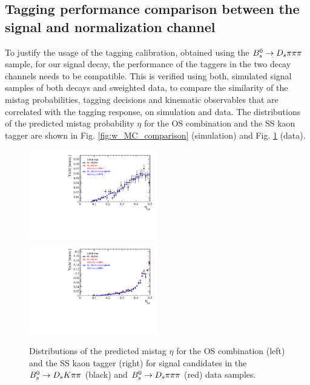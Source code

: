 \subsection{Tagging performance comparison between the signal and normalization channel}
\label{subsec: TaggingComparison}

To justify the usage of the tagging calibration, obtained using the ${{B}^0_{s}}\rightarrow{\ensuremath{{D}_{s}}}{\ensuremath{\pi}}{\ensuremath{\pi}}{\ensuremath{\pi}}$ sample, for our signal decay, the performance of the taggers in the two decay channels needs to be compatible. 
This is verified using both, simulated signal samples of both decays and sweighted data, 
to compare the similarity of the mistag probabilities, tagging decisions and kinematic observables that are correlated with the tagging response, on simulation and data.  \newline
The distributions of the predicted mistag probability $\eta$ for the OS combination and the SS kaon tagger are shown in Fig. \ref{fig:w_MC_comparison} (simulation) and Fig. \ref{fig:w_data_comparison} (data).
 


\begin{figure}[h]
\includegraphics[height=!,width=0.5\textwidth]{figs/dataVsMC/norm2signal/Ds2all_Bs_TAGOMEGA_OS.pdf}
\includegraphics[height=!,width=0.5\textwidth]{figs/dataVsMC/norm2signal/Ds2all_Bs_SS_nnetKaon_PROB.pdf}
\caption{Distributions of the predicted mistag $\eta$ for the OS combination (left) and the SS kaon tagger (right) 
for signal candidates in the ${{B}^0_{s}}\rightarrow{\ensuremath{{D}_{s}}}{\ensuremath{K}}{\ensuremath{\pi}}{\ensuremath{\pi}}$ (black) and ${{B}^0_{s}}\rightarrow{\ensuremath{{D}_{s}}}{\ensuremath{\pi}}{\ensuremath{\pi}}{\ensuremath{\pi}}$ (red) data samples.}
\label{fig:w_data_comparison}
\end{figure}

